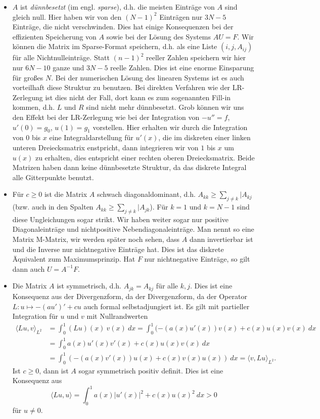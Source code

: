 \begin{itemize}
\item $A$ ist {\em dünnbesetzt} (im engl. {\em sparse}), d.h. die meisten Eintr\"age von $A$ sind gleich null. Hier haben wir von den $(N-1)^2$ Eintr\"agen nur $3N-5$ Eintr\"age, die nicht verschwinden. Dies hat einige Konsequenzen bei der effizienten Speicherung von $A$ sowie bei der L\"osung des Systems $AU =F$. Wir k\"onnen die Matrix im Sparse-Format speichern, d.h. als eine Liste $(i,j,A_{ij})$ f\"ur alle Nichtnulleintr\"age. Statt $(n-1)^2$ reeller Zahlen speichern wir hier nur $6N-10$ ganze und $3N-5$ reelle Zahlen. Dies ist eine enorme Einsparung f\"ur gro{\ss}es $N$. Bei der numerischen L\"osung des linearen Systems ist es auch vorteilhaft diese Struktur zu benutzen. Bei direkten Verfahren wie der LR-Zerlegung ist dies nicht der Fall, dort kann es zum sogenannten Fill-in kommen, d.h. $L$ und $R$ sind nicht mehr d\"unnbesetzt. Grob k\"onnen wir uns den Effekt bei der LR-Zerlegung wie bei der Integration von $-u''=f$, $u'(0) = g_0$, $u(1) =g_1$ vorstellen. Hier erhalten wir durch die Integration von $0$ bis $x$ eine Integraldarstellung f\"ur $u'(x)$, die im diskreten einer linken unteren Dreiecksmatrix enstpricht,  dann integrieren wir von $1$ bis $x$ um $u(x)$ zu erhalten, dies entspricht einer rechten oberen Dreiecksmatrix. Beide Matrizen haben dann keine d\"unnbesetzte Struktur, da das diskrete Integral alle Gitterpunkte benutzt.

\item F\"ur $c \geq 0$ ist die Matrix $A$ schwach diagonaldominant, d.h. $A_{kk} \geq \sum_{j \neq k} \vert A_{kj}$ (bzw. auch in den Spalten $A_{kk} \geq \sum_{j \neq k} \vert A_{jk}$). F\"ur $k=1$ und $k=N-1$ sind diese Ungleichungen sogar strikt.  Wir haben weiter sogar nur positive Diagonaleintr\"age und  nichtpositive Nebendiagonaleintr\"age. Man nennt so eine Matrix M-Matrix, wir werden sp\"ater noch sehen, dass $A$ dann invertierbar ist und die Inverse nur nichtnegative Eintr\"age hat. Dies ist das diskrete \"Aquivalent zum Maximumsprinzip. Hat $F$ nur nichtnegative Eintr\"age, so gilt dann auch $U = A^{-1} F$.

\item Die Matrix $A$ ist symmetrisch, d.h. $A_{jk}  = A_{kj}$ f\"ur alle $k,j$. Dies ist eine Konsequenz aus der Divergenzform, da der Divergenzform, da der Operator $L: u \mapsto - (au')' + cu$ auch formal selbstadjungiert ist. Es gilt mit partieller Integration f\"ur $u$ und $v$ mit Nullrandwerten
\begin{align*} \langle Lu, v \rangle_{L^2} &= \int_0^1 (Lu)(x)~v(x)~dx = \int_0^1 (-(a(x) u'(x))v(x) + c(x) u(x) v(x)~dx \\
&= \int_0^1 a(x) u'(x) v'(x)  + c(x) u(x) v(x)~dx \\
&= \int_0^1 (-(a(x) v'(x)) u(x) + c(x)  v(x)u(x))~dx = \langle v, Lu \rangle_{L^2} .
\end{align*}
Ist $c \geq 0$, dann ist $A$ sogar symmetrisch positiv definit. Dies ist eine Konsequenz aus
$$ \langle L u, u \rangle = \int_0^1 a(x) |u'(x)|^2   + c(x) u(x)^2 ~dx > 0 $$
f\"ur $u \neq 0$. 

\end{itemize} 

